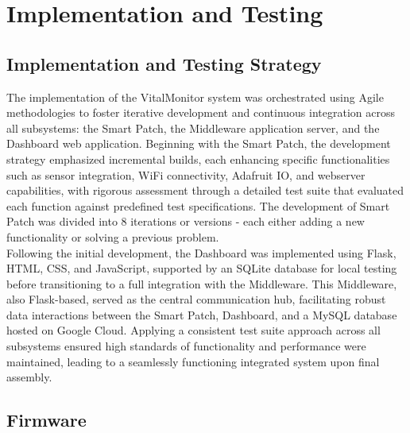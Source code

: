 \chapter{Implementation and Testing}

\section{Implementation and Testing Strategy}

The implementation of the VitalMonitor system was orchestrated using Agile methodologies to foster iterative development and continuous integration across all subsystems: the Smart Patch, the Middleware application server, and the Dashboard web application. Beginning with the Smart Patch, the development strategy emphasized incremental builds, each enhancing specific functionalities such as sensor integration, WiFi connectivity, Adafruit IO, and webserver capabilities, with rigorous assessment through a detailed test suite that evaluated each function against predefined test specifications. The development of Smart Patch was divided into 8 iterations or versions - each either adding a new functionality or solving a previous problem. \\

\noindent Following the initial development, the Dashboard was implemented using Flask, HTML, CSS, and JavaScript, supported by an SQLite database for local testing before transitioning to a full integration with the Middleware. This Middleware, also Flask-based, served as the central communication hub, facilitating robust data interactions between the Smart Patch, Dashboard, and a MySQL database hosted on Google Cloud. Applying a consistent test suite approach across all subsystems ensured high standards of functionality and performance were maintained, leading to a seamlessly functioning integrated system upon final assembly. \\



\section{Firmware}


